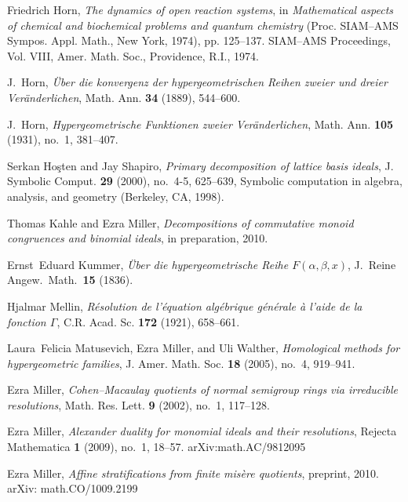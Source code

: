 \documentclass[12pt]{amsart}
\numberwithin{equation}{section}
\theoremstyle{definition}
\begin{document}
Friedrich Horn, \emph{The dynamics of open reaction systems}, in
  \emph{Mathematical aspects of chemical and biochemical problems and
  quantum chemistry} (Proc. SIAM--AMS Sympos. Appl. Math., New York,
  1974), pp. 125--137.  SIAM--AMS Proceedings, Vol. VIII,
  Amer. Math. Soc., Providence, R.I., 1974.

J.~Horn, \emph{ {\"Uber die konvergenz der hypergeometrischen {R}eihen
  zweier und dreier Ver\"anderlichen}}, Math. Ann. \textbf{34} (1889),
  544--600.

J.~Horn, \emph{Hypergeometrische {F}unktionen zweier
  Ver\"anderlichen}, Math. Ann. \textbf{105} (1931), no.~1, 381--407.

Serkan Ho\c sten and Jay Shapiro, \emph{Primary decomposition of
  lattice basis ideals}, J. Symbolic Comput. \textbf{29} (2000),
  no.~4-5, 625--639, Symbolic computation in algebra, analysis, and
  geometry (Berkeley, CA, 1998).

Thomas Kahle and Ezra Miller, \emph{Decompositions of commutative
  monoid congruences and binomial ideals}, in preparation, 2010.

Ernst~Eduard Kummer, \emph{\"Uber die hypergeometrische Reihe
  $F(\alpha,\beta,x)$}, J.\ Reine Angew.\ Math.\ \textbf{15} (1836).

Hjalmar Mellin, \emph{R\'esolution de l'\'equation alg\'ebrique
  g\'en\'erale \`a l'aide de la fonction $\Gamma$},
  C.R. Acad. Sc. \textbf{172} (1921), 658--661.

Laura~Felicia Matusevich, Ezra Miller, and Uli Walther,
  \emph{Homological methods for hypergeometric families},
  J. Amer. Math. Soc. \textbf{18} (2005), no.~4, 919--941.

Ezra Miller, \emph{Cohen--Macaulay quotients of normal semigroup
  rings via irreducible resolutions}, Math. Res. Lett. \textbf{9}
  (2002), no.~1, 117--128.

Ezra Miller, \emph{Alexander duality for monomial ideals and their
  resolutions}, Rejecta Mathematica \textbf{1} (2009), no.~1, 18--57.
  \textsf{arXiv:math.AC/9812095}

Ezra Miller, \emph{Affine stratifications from finite mis\`ere
  quotients}, preprint, 2010.  \textsf{arXiv: math.CO/1009.2199}
\end{document}
